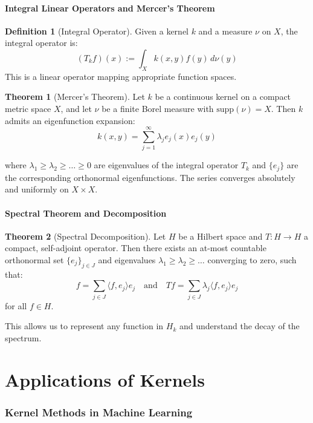 \documentclass[12pt,a4paper]{article}
\theoremstyle{definition}
\newtheorem{definition}{Definition}[section]
\newtheorem{theorem}{Theorem}[section]
\begin{document}
\subsection{Integral Linear Operators and Mercer's Theorem}

\begin{definition}[Integral Operator]
Given a kernel $k$ and a measure $\nu$ on $X$, the integral operator is:
\[
(T_k f)(x) := \int_X k(x, y) f(y) \, d\nu(y)
\]
This is a linear operator mapping appropriate function spaces.
\end{definition}

\begin{theorem}[Mercer's Theorem]
Let $k$ be a continuous kernel on a compact metric space $X$, and let $\nu$ be a finite Borel measure with $\text{supp}(\nu) = X$. Then $k$ admits an eigenfunction expansion:
\[
k(x, y) = \sum_{j=1}^{\infty} \lambda_j e_j(x) e_j(y)
\]

where $\lambda_1 \geq \lambda_2 \geq \ldots \geq 0$ are eigenvalues of the integral operator $T_k$ and $\{e_j\}$ are the corresponding orthonormal eigenfunctions. The series converges absolutely and uniformly on $X \times X$.
\end{theorem}

\subsection{Spectral Theorem and Decomposition}

\begin{theorem}[Spectral Decomposition]
Let $H$ be a Hilbert space and $T: H \to H$ a compact, self-adjoint operator. Then there exists an at-most countable orthonormal set $\{e_j\}_{j \in J}$ and eigenvalues $\lambda_1 \geq \lambda_2 \geq \ldots$ converging to zero, such that:
\[
f = \sum_{j \in J} \langle f, e_j \rangle e_j \quad \text{and} \quad T f = \sum_{j \in J} \lambda_j \langle f, e_j \rangle e_j
\]
for all $f \in H$.
\end{theorem}

This allows us to represent any function in $H_k$ and understand the decay of the spectrum.

\newpage
\part{Applications of Kernels}

\section{Kernel Methods in Machine Learning}
\end{document}
